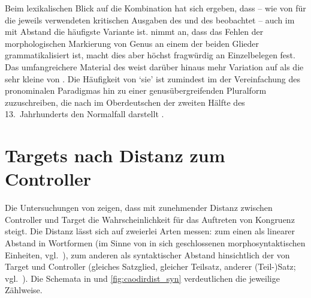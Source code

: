 Beim lexikalischen Blick auf die Kombination  hat sich ergeben,
dass -- wie von \citet{askedal1973} für die jeweils verwendeten kritischen
Ausgaben des  und des  beobachtet -- auch im
\CAO{} mit Abstand die häufigste Variante  ist.
\citeauthor{askedal1973} nimmt an, dass das Fehlen der morphologischen
Markierung von Genus an einem der beiden Glieder
grammatikalisiert ist, macht dies aber höchst fragwürdig an Einzelbelegen fest.
Das umfangreichere Material des \CAO{} weist darüber hinaus mehr Variation auf
als die sehr kleine  von \citeauthor{askedal1973}. Die
Häufigkeit von  `sie' ist zumindest im \CAO{} der
Vereinfachung des pronominalen Paradigmas hin zu einer
genusübergreifenden Pluralform
zuzuschreiben, die nach \citet[391--392]{ksw2}
im Oberdeutschen der zweiten Hälfte des 13.~Jahrhunderts den
Normalfall darstellt \autocite[vgl.\ auch][37--39]{sparmann1961}.



\section{Targets nach Distanz zum Controller}
\label{sec:caotargdist}


Die Untersuchungen von \citet{corbett1979} zeigen, dass mit zunehmender Distanz
zwischen Controller und Target die Wahrscheinlichkeit für das Auftreten von
Kongruenz  steigt. Die Distanz lässt sich auf zweierlei Arten
messen: zum einen als linearer Abstand in Wortformen (im
Sinne von in sich geschlossenen morphosyntaktischen Einheiten,
vgl.~\cite[252--253]{bauer2000}), zum anderen als syntaktischer
Abstand hinsichtlich der  von Target und
Controller (gleiches Satzglied, gleicher Teilsatz, anderer (Teil-)Satz;
vgl.~). Die Schemata in
 und \ref{fig:caodirdist_syn} verdeutlichen die
jeweilige Zählweise.


